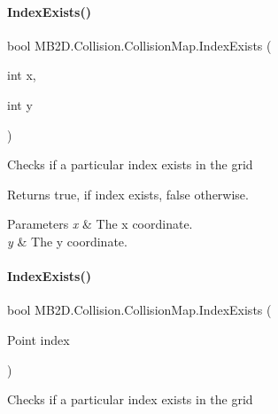 \paragraph{\texorpdfstring{Index\+Exists()}{IndexExists()}\hspace{0.1cm}{\footnotesize\ttfamily [1/2]}}
{\footnotesize\ttfamily bool M\+B2\+D.\+Collision.\+Collision\+Map.\+Index\+Exists (\begin{DoxyParamCaption}\item[{int}]{x,  }\item[{int}]{y }\end{DoxyParamCaption})\hspace{0.3cm}{\ttfamily [inline]}}



Checks if a particular index exists in the grid 

\begin{DoxyReturn}{Returns}
{\ttfamily true}, if index exists, {\ttfamily false} otherwise.
\end{DoxyReturn}

\begin{DoxyParams}{Parameters}
{\em x} & The x coordinate.\\
\hline
{\em y} & The y coordinate.\\
\hline
\end{DoxyParams}
\hypertarget{class_m_b2_d_1_1_collision_1_1_collision_map_aa90ce934e081513f78aceacab50f27da}{}\label{class_m_b2_d_1_1_collision_1_1_collision_map_aa90ce934e081513f78aceacab50f27da} 
\paragraph{\texorpdfstring{Index\+Exists()}{IndexExists()}\hspace{0.1cm}{\footnotesize\ttfamily [2/2]}}
{\footnotesize\ttfamily bool M\+B2\+D.\+Collision.\+Collision\+Map.\+Index\+Exists (\begin{DoxyParamCaption}\item[{Point}]{index }\end{DoxyParamCaption})\hspace{0.3cm}{\ttfamily [inline]}}



Checks if a particular index exists in the grid 

